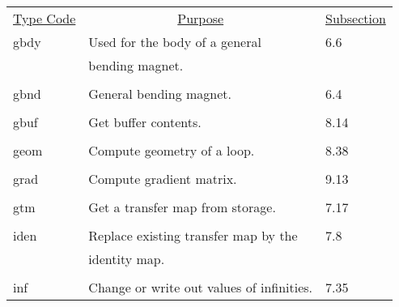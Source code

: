 \begin{center}
\newpage
\begin{tabular}{lll}
\multicolumn{1}{c}{\underline {Type Code}} &
\multicolumn{1}{c}{\underline{Purpose}}   &
\multicolumn{1}{c}{\underline{Subsection}} \\
\hspace{1.5em}gbdy    &    Used for the body of a general  &  \hspace{2em}6.6 \\
               &             bending magnet.                 &\\
\vspace{-3mm}& &\\
\hspace{1.5em}gbnd    &     General bending magnet.   &  \hspace{2em}6.4 \\
\vspace{-3mm}& &\\
\hspace{1.5em}gbuf    &     Get buffer contents.     &  \hspace{2em}8.14\\
\vspace{-3mm}& &\\
\hspace{1.5em}geom    &  Compute geometry of a loop.    &  \hspace{2em}8.38\\
\vspace{-3mm}& &\\
\hspace{1.5em}grad    &    Compute gradient matrix.      &     \hspace{2em}9.13\\
\vspace{-3mm}& &\\
\hspace{1.5em}gtm   &  Get a transfer map from storage.    & \hspace{2em}7.17\\
\vspace{-3mm}& &\\
\hspace{1.5em}iden  &   Replace existing transfer map by the & \hspace{2em}7.8\\
                    & identity map.                                &\\
\vspace{-3mm}& &\\
\hspace{1.5em}inf  & Change or write out values of infinities. & \hspace{2em}7.35\\

\end{tabular}
\end{center}
